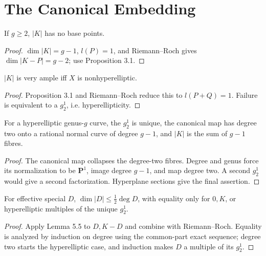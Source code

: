 \section{The Canonical Embedding}
\label{ha-ch4-s5}
\begin{lemma}\label{ha-ch4-l51}
If \(g\ge2\), \(|K|\) has no base points.
\end{lemma}
\begin{proof}\(\dim|K|=g-1\), \(l(P)=1\), and Riemann--Roch gives
\(\dim|K-P|=g-2\); use Proposition 3.1.\end{proof}
\begin{proposition}\label{ha-ch4-p52}
\(|K|\) is very ample iff \(X\) is nonhyperelliptic.
\end{proposition}
\begin{proof}Proposition 3.1 and Riemann--Roch reduce this to \(l(P+Q)=1\).
Failure is equivalent to a \(g^1_2\), i.e. hyperellipticity.\end{proof}
\begin{proposition}\label{ha-ch4-p53}
For a hyperelliptic genus-\(g\) curve, the \(g^1_2\) is unique, the canonical
map has degree two onto a rational normal curve of degree \(g-1\), and
\(|K|\) is the sum of \(g-1\) fibres.
\end{proposition}
\begin{proof}The canonical map collapses the degree-two fibres.  Degree and genus
force its normalization to be \(\mathbf P^1\), image degree \(g-1\), and map
degree two.  A second \(g^1_2\) would give a second factorization.  Hyperplane
sections give the final assertion.\end{proof}
\begin{theorem}[Clifford]\label{ha-ch4-t54}
For effective special \(D\), \(\dim|D|\le\frac12\deg D\), with equality only
for \(0,K\), or hyperelliptic multiples of the unique \(g^1_2\).
\end{theorem}
\begin{proof}Apply Lemma 5.5 to \(D,K-D\) and combine with Riemann--Roch.
Equality is analyzed by induction on degree using the common-part exact
sequence; degree two starts the hyperelliptic case, and induction makes \(D\)
a multiple of its \(g^1_2\).\end{proof}

